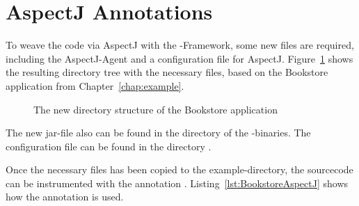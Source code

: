 \section{AspectJ Annotations}\label{sec:aspectJ:annotation}

To weave the code via AspectJ with the \Kieker{}-Framework,
some new files are required, including the AspectJ-Agent and a configuration
file for AspectJ. Figure~\ref{fig:bookstoreAOP:dirStructure} shows the resulting %
directory tree with the necessary files, based on the Bookstore application from %
Chapter~\ref{chap:example}.

\begin{figure}[H]
\begin{graybox}
\end{graybox}

\caption{The new directory structure of the Bookstore application}
\label{fig:bookstoreAOP:dirStructure}
\end{figure}

\noindent The new jar-file  also can be found
in the  directory of the \Kieker{}-binaries. The
configuration file \file{\aopConfigFile} can be found in the directory .

Once the necessary files has been copied to the example-directory,
the sourcecode can be instrumented with the annotation .
Listing~\ref{lst:BookstoreAspectJ} shows how the annotation is
used.

\setJavaCodeListing


